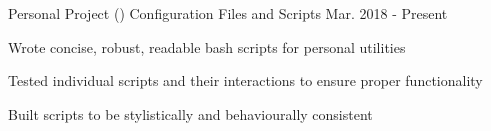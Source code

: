 \begin{cventries}
	\cventry
      {Personal Project ()}
      {Configuration Files and Scripts}
      {Mar. 2018 - Present}
      {}
      {
        \begin{cvitems}
          \item{Wrote concise, robust, readable bash scripts for personal utilities}
          \item{Tested individual scripts and their interactions to ensure proper functionality}
          \item{Built scripts to be stylistically and behaviourally consistent}

\end{cvitems}}
\end{cventries}
